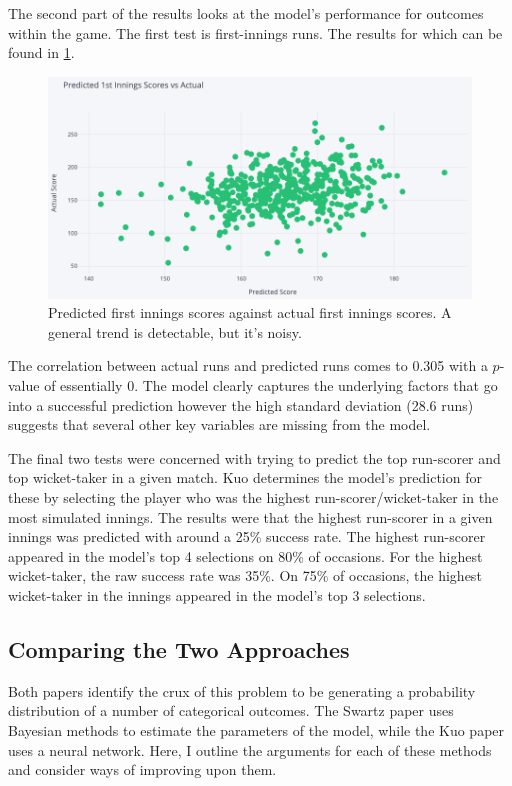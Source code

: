 The second part of the results looks at the model’s performance for outcomes within the game. The first test is first-innings runs. The results for which can be found in \cref{fig:kuo5}.

\begin{figure}[hb]
    \vspace{0.5em}
    \centering
    \includegraphics[width=0.9\columnwidth]{images/kuo5.png}
    \caption{Predicted first innings scores against actual first innings scores. A general trend is detectable, but it's noisy.}
    \label{fig:kuo5}
\end{figure}

The correlation between actual runs and predicted runs comes to 0.305 with a $p$-value of essentially 0. The model clearly captures the underlying factors that go into a successful prediction however the high standard deviation (28.6 runs) suggests that several other key variables are missing from the model.

The final two tests were concerned with trying to predict the top run-scorer and top wicket-taker in a given match. Kuo determines the model’s prediction for these by selecting the player who was the highest run-scorer/wicket-taker in the most simulated innings. The results were that the highest run-scorer in a given innings was predicted with around a 25\% success rate. The highest run-scorer appeared in the model’s top 4 selections on 80\% of occasions. For the highest wicket-taker, the raw success rate was 35\%. On 75\% of occasions, the highest wicket-taker in the innings appeared in the model’s top 3 selections.

\subsection{Comparing the Two Approaches}

Both papers identify the crux of this problem to be generating a probability distribution of a number of categorical outcomes. The Swartz paper uses Bayesian methods to estimate the parameters of the model, while the Kuo paper uses a neural network. Here, I outline the arguments for each of these methods and consider ways of improving upon them.

